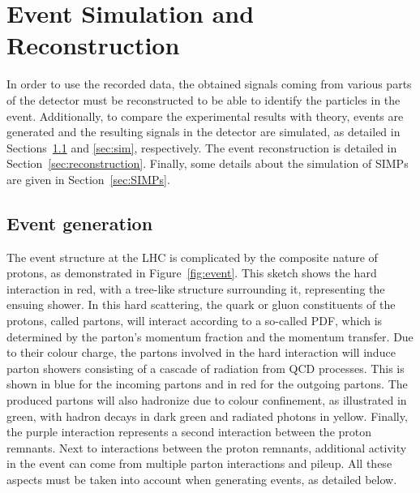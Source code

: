 \graphicspath{{chapt_dutch/}{intro/}{detector/}{reconstruction/}}

\renewcommand\evenpagerightmark{{\scshape\small Chapter 4}}
\renewcommand\oddpageleftmark{{\scshape\small Event Simulation and Reconstruction}}

\hyphenation{}

\chapter{Event Simulation and Reconstruction}
\label{ch:reconstruction}

In order to use the recorded data, the obtained signals coming from various parts of the detector must be reconstructed to be able to identify the particles in the event. Additionally, to compare the experimental results with theory, events are generated and the resulting signals in the detector are simulated, as detailed in Sections~\ref{sec:generation} and \ref{sec:sim}, respectively. The event reconstruction is detailed in Section~\ref{sec:reconstruction}. Finally, some details about the simulation of \acp{SIMP} are given in Section~\ref{sec:SIMPs}.

\section{Event generation}
\label{sec:generation}


The event structure at the \ac{LHC} is complicated by the composite nature of protons, as demonstrated in Figure~\ref{fig:event}. This sketch shows the hard interaction in red, with a tree-like structure surrounding it, representing the ensuing shower. In this hard scattering, the quark or gluon constituents of the protons, called partons, will interact according to a so-called \ac{PDF}, which is determined by the parton's momentum fraction and the momentum transfer. Due to their colour charge, the partons involved in the hard interaction will induce parton showers consisting of a cascade of radiation from \acs{QCD} processes. This is shown in blue for the incoming partons and in red for the outgoing partons. The produced partons will also hadronize due to colour confinement, as illustrated in green, with hadron decays in dark green and radiated photons in yellow. Finally, the purple interaction represents a second interaction between the proton remnants. Next to interactions between the proton remnants, additional activity in the event can come from multiple parton interactions and pileup. All these aspects must be taken into account when generating events, as detailed below.

